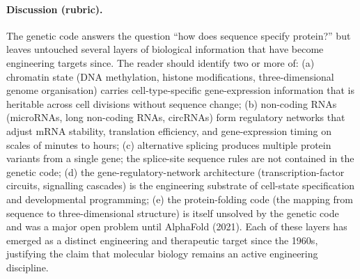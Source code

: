 \paragraph{Discussion (rubric).} The genetic code answers the question
``how does sequence specify protein?'' but leaves untouched several
layers of biological information that have become engineering targets
since. The reader should identify two or more of: (a) chromatin state
(DNA methylation, histone modifications, three-dimensional genome
organisation) carries cell-type-specific gene-expression information
that is heritable across cell divisions without sequence change;
(b) non-coding RNAs (microRNAs, long non-coding RNAs, circRNAs) form
regulatory networks that adjust mRNA stability, translation
efficiency, and gene-expression timing on scales of minutes to hours;
(c) alternative splicing produces multiple protein variants from a
single gene; the splice-site sequence rules are not contained in the
genetic code; (d) the gene-regulatory-network architecture
(transcription-factor circuits, signalling cascades) is the engineering
substrate of cell-state specification and developmental programming;
(e) the protein-folding code (the mapping from sequence to
three-dimensional structure) is itself unsolved by the genetic code
and was a major open problem until AlphaFold (2021). Each of these
layers has emerged as a distinct engineering and therapeutic
target since the 1960s, justifying the claim that molecular biology
remains an active engineering discipline.
